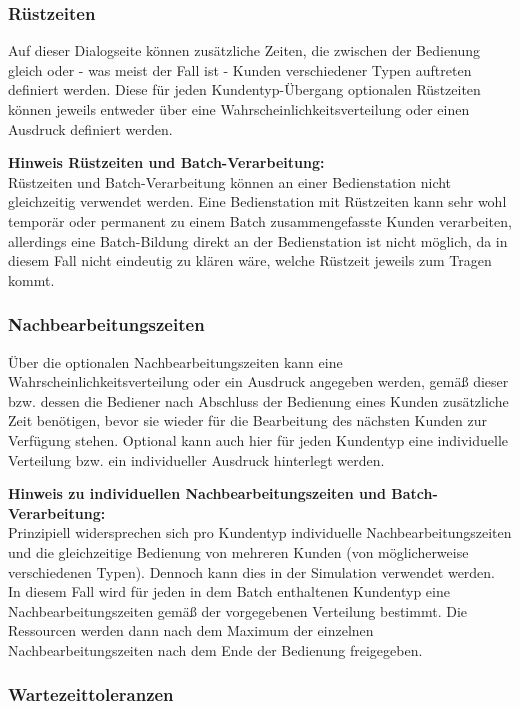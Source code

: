 \subsubsection*{Rüstzeiten}

Auf dieser Dialogseite können zusätzliche Zeiten, die zwischen der Bedienung gleich oder - was meist der Fall ist -
Kunden verschiedener Typen auftreten definiert werden. Diese für jeden Kundentyp-Übergang optionalen Rüstzeiten
können jeweils entweder über eine Wahrscheinlichkeitsverteilung oder einen Ausdruck definiert werden.

\textbf{Hinweis Rüstzeiten und Batch-Verarbeitung:}~\\
Rüstzeiten und Batch-Verarbeitung können an einer Bedienstation nicht gleichzeitig
verwendet werden. Eine Bedienstation mit Rüstzeiten kann sehr wohl temporär oder permanent
zu einem Batch zusammengefasste Kunden verarbeiten, allerdings eine Batch-Bildung direkt an
der Bedienstation ist nicht möglich, da in diesem Fall nicht eindeutig zu klären wäre,
welche Rüstzeit jeweils zum Tragen kommt.

\subsubsection*{Nachbearbeitungszeiten}

Über die optionalen Nachbearbeitungszeiten kann eine Wahrscheinlichkeitsverteilung oder ein Ausdruck angegeben werden, gemäß
dieser bzw. dessen die Bediener nach Abschluss der Bedienung eines Kunden zusätzliche Zeit benötigen, bevor sie wieder für
die Bearbeitung des nächsten Kunden zur Verfügung stehen. Optional kann auch hier für jeden Kundentyp eine individuelle Verteilung
bzw. ein individueller Ausdruck hinterlegt werden.

\textbf{Hinweis zu individuellen Nachbearbeitungszeiten und Batch-Verarbeitung:}~\\
Prinzipiell widersprechen sich pro Kundentyp individuelle Nachbearbeitungszeiten und die gleichzeitige Bedienung von mehreren Kunden
(von möglicherweise verschiedenen Typen). Dennoch kann dies in der Simulation verwendet werden. In diesem Fall wird für jeden
in dem Batch enthaltenen Kundentyp eine Nachbearbeitungszeiten gemäß der vorgegebenen Verteilung bestimmt. Die Ressourcen werden
dann nach dem Maximum der einzelnen Nachbearbeitungszeiten nach dem Ende der Bedienung freigegeben.

\subsubsection*{Wartezeittoleranzen}

